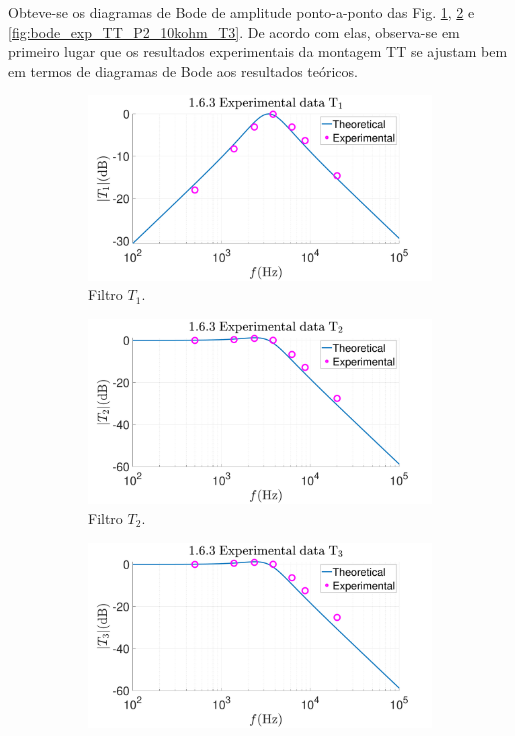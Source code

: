 Obteve-se os diagramas de Bode de amplitude ponto-a-ponto das Fig. \ref{fig:bode_exp_TT_P2_10kohm_T1}, \ref{fig:bode_exp_TT_P2_10kohm_T2} e \ref{fig:bode_exp_TT_P2_10kohm_T3}. De acordo com elas, observa-se em primeiro lugar que os resultados experimentais da montagem TT se ajustam bem em termos de diagramas de Bode aos resultados teóricos. 
\begin{figure}[ht]
     \begin{subfigure}[b]{0.45\textwidth}
         \centering
         \includegraphics[width=\textwidth]{Imagens/1_6_3_bodeExperimental1.pdf}
         \caption{Filtro $T_1$.}
         \label{fig:bode_exp_TT_P2_10kohm_T1}
     \end{subfigure}
     \hfill
     \begin{subfigure}[b]{0.45\textwidth}
         \centering
         \includegraphics[width=\textwidth]{Imagens/1_6_3_bodeExperimental2.pdf}
         \caption{Filtro $T_2$.}
         \label{fig:bode_exp_TT_P2_10kohm_T2}
     \end{subfigure}
     \begin{subfigure}[b]{0.45\textwidth}
         \centering
         \includegraphics[width=\textwidth]{Imagens/1_6_3_bodeExperimental3.pdf}

\end{subfigure}
\end{figure}

